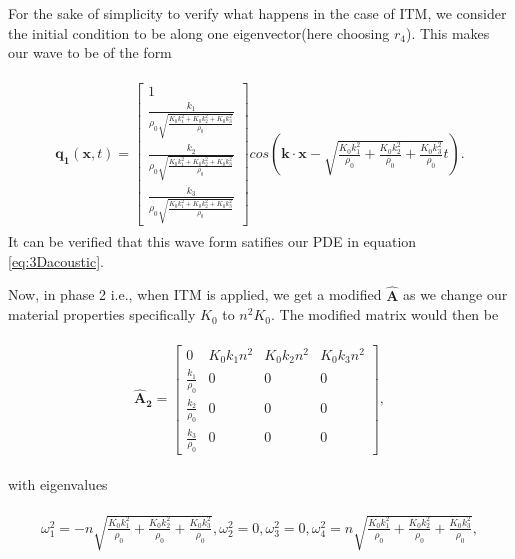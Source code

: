 For the sake of simplicity to verify what happens in the case of ITM, we consider the initial condition to be along one eigenvector(here choosing $r_4$).
This makes our wave to be of the form 

\begin{align}
    \begin{split}
        \mathbf{q_1}\left(\mathbf{x}, t\right) = \begin{bmatrix}
            1 \\
\frac{k_{1}}{\rho_{0} \sqrt{\frac{K_{0} k_{1}^{2} + K_{0} k_{2}^{2} + K_{0} k_{3}^{2}}{\rho_{0}}}} \\
\frac{k_{2}}{\rho_{0} \sqrt{\frac{K_{0} k_{1}^{2} + K_{0} k_{2}^{2} + K_{0} k_{3}^{2}}{\rho_{0}}}} \\
\frac{k_{3}}{\rho_{0} \sqrt{\frac{K_{0} k_{1}^{2} + K_{0} k_{2}^{2} + K_{0} k_{3}^{2}}{\rho_{0}}}}
            \end{bmatrix} cos\left(\mathbf{k}\cdot\mathbf{x} - \sqrt{\frac{K_{0} k_{1}^{2}}{\rho_{0}} + \frac{K_{0} k_{2}^{2}}{\rho_{0}} + \frac{K_{0} k_{3}^{2}}{\rho_{0}}} t\right) .
    \end{split}
\end{align}
It can be verified that this wave form satifies our PDE in equation \ref{eq:3Dacoustic}.

Now, in phase 2 i.e., when ITM is applied, we get a modified $\mathbf{\hat{A}}$ as we change our material properties specifically $K_0$ to $n^2K_0$. The modified matrix would then be

\begin{align}
    \begin{split}
    \mathbf{\hat{A}_2} = \begin{bmatrix}
        0 & K_{0} k_{1} n^{2} & K_{0} k_{2} n^{2} & K_{0} k_{3} n^{2} \\
\frac{k_{1}}{\rho_{0}} & 0 & 0 & 0 \\
\frac{k_{2}}{\rho_{0}} & 0 & 0 & 0 \\
\frac{k_{3}}{\rho_{0}} & 0 & 0 & 0
    \end{bmatrix},
    \end{split}
\end{align}

with eigenvalues

\begin{align}
    \begin{split}
    \omega_1^2 = -n \sqrt{\frac{K_{0} k_{1}^{2}}{\rho_{0}} + \frac{K_{0} k_{2}^{2}}{\rho_{0}} + \frac{K_{0} k_{3}^{2}}{\rho_{0}}},
    \omega_2^2 = 0,
    \omega_3^2 = 0,
    \omega_4^2 = n \sqrt{\frac{K_{0} k_{1}^{2}}{\rho_{0}} + \frac{K_{0} k_{2}^{2}}{\rho_{0}} + \frac{K_{0} k_{3}^{2}}{\rho_{0}}},
    \end{split}
\end{align}

